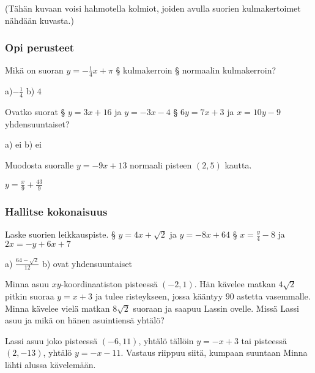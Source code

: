 (Tähän kuvaan voisi hahmotella kolmiot, joiden avulla suorien kulmakertoimet nähdään kuvasta.)



\begin{tehtavasivu}

\subsubsection*{Opi perusteet}

\begin {tehtava}
Mikä on suoran $y=-\frac{1}{4}x+\pi$
\alakohdat
§ kulmakerroin
§ normaalin kulmakerroin?
\loppu
\begin {vastaus}
a)$-\frac{1}{4}$  b) $4$ 
\end {vastaus}
\end {tehtava}

\begin {tehtava}
Ovatko suorat 
\alakohdat
§ $y=3x+16$ ja $y=-3x-4$
§ $6y=7x+3$ ja $x=10y-9$ yhdensuuntaiset?
\loppu
\begin {vastaus}
a) ei b) ei
\end {vastaus}
\end {tehtava}

\begin {tehtava}
Muodosta suoralle $y=-9x+13$ normaali pisteen $(2, 5)$ kautta.
\begin {vastaus}
$y=\frac{x}{9}+\frac{43}{9}$
\end {vastaus}
\end {tehtava}

\subsubsection*{Hallitse kokonaisuus}

\begin {tehtava}
Laske suorien leikkauspiste.
\alakohdat
§ $y=4x+\sqrt{2}$ ja $y=-8x+64$
§ $x=\frac{y}{4}-8$ ja $2x=-y+6x+7$
\loppu
\begin {vastaus}
a) $\frac{64-\sqrt{2}}{12}$ b) ovat yhdensuuntaiset
\end {vastaus}
\end {tehtava}

\begin {tehtava}
Minna asuu $xy$-koordinaatiston pisteessä $(-2, 1)$. Hän kävelee matkan $4\sqrt{2}$ pitkin suoraa $y=x+3$ ja tulee risteykseen, jossa kääntyy $90$ astetta vasemmalle. Minna kävelee vielä matkan $8\sqrt{2}$ suoraan ja saapuu Lassin ovelle. Missä Lassi asuu ja mikä on hänen asuintiensä yhtälö?
\begin {vastaus}
Lassi asuu joko pisteessä $(-6, 11)$, yhtälö tällöin $y=-x+3$ tai pisteessä $(2, -13)$, yhtälö $y=-x-11$. Vastaus riippuu siitä, kumpaan suuntaan Minna lähti alussa kävelemään.
\end {vastaus}
\end {tehtava}


\end{tehtavasivu}

